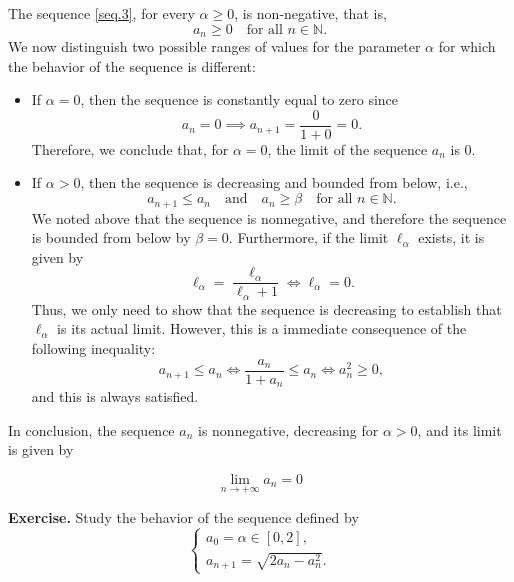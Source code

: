 \documentclass[a4paper,10 pt]{report}
\newcommand{\finalanswer}[1]{%
    \begin{finalAnswer}
    \[
        #1
    \]
    \end{finalAnswer}
}
\theoremstyle{definition}
\newcommand{\N}{\mathbb N}
\begin{document}
\begin{solutionBox}
The sequence \eqref{seq.3}, for every $\alpha \geq 0$, is non-negative, that is,
\begin{equation*} a_n \geq 0 \quad \text{for all $n \in \N$}. \end{equation*}
We now distinguish two possible ranges of values for the parameter $\alpha$ for which the behavior of the sequence is different:

\begin{itemize}
	\item If $\alpha = 0$, then the sequence is constantly equal to zero since
\begin{equation*} a_{n} = 0 \implies a_{n + 1} = \frac{0}{1 + 0} = 0. \end{equation*}
Therefore, we conclude that, for $\alpha = 0$, the limit of the sequence $a_n$ is $0$.

\item If $\alpha > 0$, then the sequence is decreasing and bounded from below, i.e.,
\begin{equation*} a_{n + 1} \leq a_n \quad \text{and} \quad a_n \geq \beta \quad \text{for all $n \in \N$}. \end{equation*}
We noted above that the sequence is nonnegative, and therefore the sequence is bounded from below by $\beta = 0$. Furthermore, if the limit $\ell_\alpha$ exists, it is given by
\begin{equation*}\ell_\alpha = \frac{\ell_\alpha}{\ell_\alpha + 1} \iff \ell_\alpha = 0. \end{equation*}
Thus, we only need to show that the sequence is decreasing to establish that $\ell_\alpha$ is its actual limit. However, this is a immediate consequence of the following inequality:
\begin{equation*}a_{n + 1} \leq a_n \iff \frac{a_n}{1 + a_n} \leq a_n \iff a_n^2 \geq 0,\end{equation*}
and this is always satisfied.
\end{itemize}

In conclusion, the sequence $a_n$ is nonnegative, decreasing for $\alpha > 0$, and its limit is given by
\finalanswer{\lim_{n \to + \infty} a_n =0}
\end{solutionBox}

\begin{exerciseBox} \textbf{Exercise.} Study the behavior of the sequence defined by
\begin{equation}\label{seq.4} \begin{cases} a_0 = \alpha \in [0, 2], \\ a_{n + 1} =\sqrt{2a_n - a_n^2}. \end{cases} \end{equation}
\end{exerciseBox}
\end{document}
